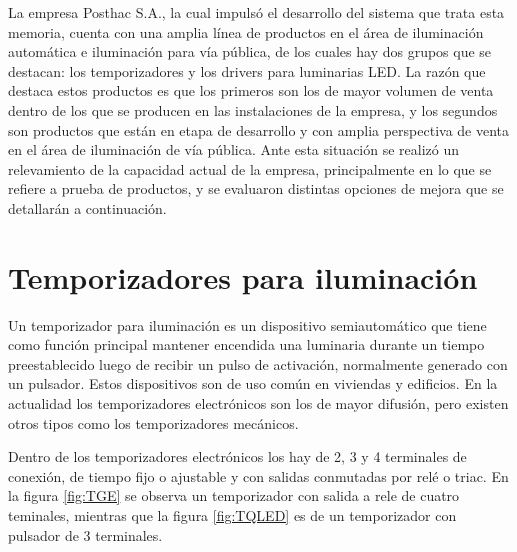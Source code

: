 La empresa Posthac S.A., la cual impulsó el desarrollo del sistema que trata esta memoria, cuenta con una amplia línea de productos en el área de iluminación automática e iluminación para vía pública, de los cuales hay dos grupos que se destacan: los temporizadores y los drivers para luminarias LED. La razón que destaca estos productos es que los primeros son los de mayor volumen de venta dentro de los que se producen en las instalaciones de la empresa, y los segundos son productos que están en etapa de desarrollo y con amplia perspectiva de venta en el área de iluminación de vía pública.
Ante esta situación se realizó un relevamiento de la capacidad actual de la empresa, principalmente en lo que se refiere a prueba de productos, y se evaluaron distintas opciones de mejora que se detallarán a continuación.


\section{Temporizadores para iluminación}

Un temporizador para iluminación es un dispositivo semiautomático que tiene como función principal mantener encendida una luminaria durante un tiempo preestablecido luego de recibir un pulso de activación, normalmente generado con un pulsador. Estos dispositivos son de uso común en viviendas y edificios. En la actualidad los temporizadores electrónicos son los de mayor difusión, pero existen otros tipos como los temporizadores mecánicos.

Dentro de los temporizadores electrónicos los hay de 2, 3 y 4 terminales de conexión, de tiempo fijo o ajustable y con salidas conmutadas por relé o triac. En la figura \ref{fig:TGE} se observa un temporizador con salida a rele de cuatro teminales, mientras que la figura \ref{fig:TQLED} es de un temporizador con pulsador de 3 terminales.

